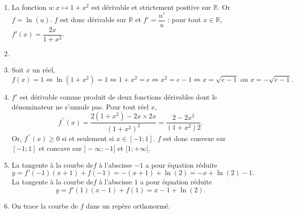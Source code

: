 \documentclass[11pt,fleqn, openany]{book} %
\begin{document}
\begin{solution}\hspace{0pt}
\begin{enumerate}\item La fonction \(u:x\mapsto 1+x^2\) est dérivable et strictement positive sur \(\mathbb{R}\). Or $f=\ln(u)$. \(f\) est donc dérivable sur $\mathbb{R}$ et $f'=\dfrac{u'}{u}$ : pour tout \(x\in\mathbb{R}\), $f'(x)=\dfrac{2x}{1+x^2}$.
\item 
{}


\item Soit \(x\) un réel,
	\[f(x)=1 \Leftrightarrow \ln(1+x^2)=1 \Leftrightarrow 1+x^2=e \Leftrightarrow x^2=e-1 \Leftrightarrow x=\sqrt{e-1} \text{ ou }x = -\sqrt{e-1}.\]
	\item \(f'\) est dérivable comme produit de deux fonctions dérivables dont le dénominateur ne s'annule pas. Pour tout réel \(x\),
\[f^{\prime\prime}(x)= \dfrac{2(1+x^2)-2x \times 2x}{(1+x^2)^2}=\dfrac{2-2x^2}{(1+x^2)2}.\]
Or, \(f^{\prime\prime}(x)\geqslant 0\) si et seulement si \(x \in [-1;1]\). \(f\) est donc convexe sur \([-1;1]\) et concave sur \(]-\infty;-1]\) et \([1;+\infty[\).
\item La tangente à la courbe de\(f\) à l'abscisse \(-1\) a pour équation réduite \[y = f'(-1)(x+1)+f(-1) = -(x+1)+\ln(2)=-x+\ln(2)-1.\]
	La tangente à la courbe de\(f\) à l'abscisse \(1\) a pour équation réduite \[y = f'(1)(x-1)+f(1) = x-1+\ln(2).\]
	\item On trace la courbe de $f$ dans un repère orthonormé.
\begin{center}
\end{center}
\end{enumerate}
\end{solution}
\end{document}
